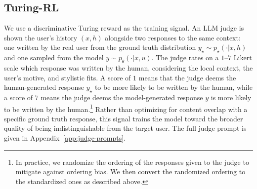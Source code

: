 \documentclass[11pt]{article}
\begin{document}


\subsection{Turing-RL}\label{sec:training}
We use a discriminative Turing reward as the training signal. An LLM judge is shown the user's  history $(x, h)$ alongside two responses to the same context: one written by the real user from the ground truth distribution $y_{\star} \sim p_\star(\cdot | x,h)$ and one sampled from the model $y \sim p_\theta( \cdot | x, u )$. The judge rates on a $1$--$7$ Likert scale which response was written by the human, considering the local context, the user's motive, and stylistic fits. A score of $1$ means that the judge deems the human-generated response $y_{\star}$ to be more likely to be written by the human, while a score of $7$ means the judge deems the model-generated response $y$ is more likely to be written by the human.\footnote{In practice, we randomize the ordering of the responses given to the judge to mitigate against ordering bias. We then convert the randomized ordering to the standardized ones as described above.} Rather than optimizing for content overlap with a specific ground truth response, this signal trains the model toward the broader quality of being indistinguishable from the target user. The full judge prompt is given in Appendix~\ref{app:judge-prompts}.
\end{document}
